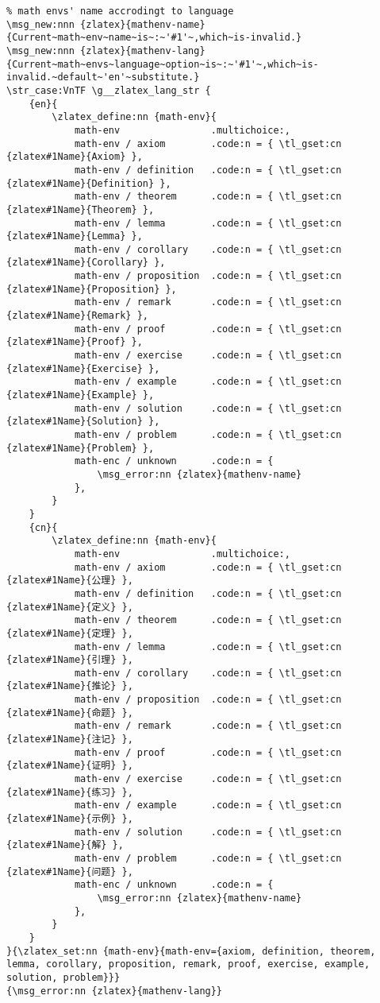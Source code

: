 \begin{verbatim}
% math envs' name accrodingt to language
\msg_new:nnn {zlatex}{mathenv-name}{Current~math~env~name~is~:~'#1'~,which~is-invalid.}
\msg_new:nnn {zlatex}{mathenv-lang}{Current~math~envs~language~option~is~:~'#1'~,which~is-invalid.~default~'en'~substitute.}
\str_case:VnTF \g__zlatex_lang_str { 
    {en}{
        \zlatex_define:nn {math-env}{
            math-env                .multichoice:,
            math-env / axiom        .code:n = { \tl_gset:cn {zlatex#1Name}{Axiom} },
            math-env / definition   .code:n = { \tl_gset:cn {zlatex#1Name}{Definition} },
            math-env / theorem      .code:n = { \tl_gset:cn {zlatex#1Name}{Theorem} },
            math-env / lemma        .code:n = { \tl_gset:cn {zlatex#1Name}{Lemma} },
            math-env / corollary    .code:n = { \tl_gset:cn {zlatex#1Name}{Corollary} },
            math-env / proposition  .code:n = { \tl_gset:cn {zlatex#1Name}{Proposition} },
            math-env / remark       .code:n = { \tl_gset:cn {zlatex#1Name}{Remark} },
            math-env / proof        .code:n = { \tl_gset:cn {zlatex#1Name}{Proof} },
            math-env / exercise     .code:n = { \tl_gset:cn {zlatex#1Name}{Exercise} },
            math-env / example      .code:n = { \tl_gset:cn {zlatex#1Name}{Example} },
            math-env / solution     .code:n = { \tl_gset:cn {zlatex#1Name}{Solution} },
            math-env / problem      .code:n = { \tl_gset:cn {zlatex#1Name}{Problem} },
            math-enc / unknown      .code:n = {
                \msg_error:nn {zlatex}{mathenv-name}
            },
        }
    }
    {cn}{
        \zlatex_define:nn {math-env}{
            math-env                .multichoice:,
            math-env / axiom        .code:n = { \tl_gset:cn {zlatex#1Name}{公理} },
            math-env / definition   .code:n = { \tl_gset:cn {zlatex#1Name}{定义} },
            math-env / theorem      .code:n = { \tl_gset:cn {zlatex#1Name}{定理} },
            math-env / lemma        .code:n = { \tl_gset:cn {zlatex#1Name}{引理} },
            math-env / corollary    .code:n = { \tl_gset:cn {zlatex#1Name}{推论} },
            math-env / proposition  .code:n = { \tl_gset:cn {zlatex#1Name}{命题} },
            math-env / remark       .code:n = { \tl_gset:cn {zlatex#1Name}{注记} },
            math-env / proof        .code:n = { \tl_gset:cn {zlatex#1Name}{证明} },
            math-env / exercise     .code:n = { \tl_gset:cn {zlatex#1Name}{练习} },
            math-env / example      .code:n = { \tl_gset:cn {zlatex#1Name}{示例} },
            math-env / solution     .code:n = { \tl_gset:cn {zlatex#1Name}{解} },
            math-env / problem      .code:n = { \tl_gset:cn {zlatex#1Name}{问题} },
            math-enc / unknown      .code:n = {
                \msg_error:nn {zlatex}{mathenv-name}
            },
        }
    }
}{\zlatex_set:nn {math-env}{math-env={axiom, definition, theorem, lemma, corollary, proposition, remark, proof, exercise, example, solution, problem}}}
{\msg_error:nn {zlatex}{mathenv-lang}}


\end{verbatim}
